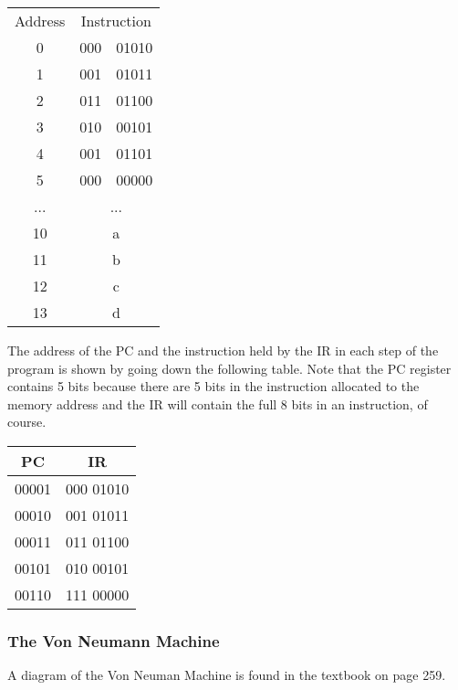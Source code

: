 \documentclass[]{article}
\begin{document}
\begin{center}
	\begin{tabular}{c|c|c|}
		\multicolumn{1}{c}{Address} & \multicolumn{2}{c}{Instruction}\\\cline{2-3}
		0 & 000 & 01010 \\\cline{2-3}
		1 & 001 & 01011 \\\cline{2-3}
		2 & 011 & 01100 \\\cline{2-3}
		3 & 010 & 00101 \\\cline{2-3}
		4 & 001 & 01101 \\\cline{2-3}
		5 & 000 & 00000 \\\cline{2-3}
		...&\multicolumn{2}{|c|}{...} \\\cline{2-3}
		10 & \multicolumn{2}{|c|}{a} \\\cline{2-3}
		11 & \multicolumn{2}{|c|}{b} \\\cline{2-3}
		12 & \multicolumn{2}{|c|}{c} \\\cline{2-3}
		13 & \multicolumn{2}{|c|}{d} \\\cline{2-3}
	\end{tabular}
	\bigbreak
\end{center}

The address of the PC and the instruction held by the IR in each step of the program is shown by going down the following table. Note that the PC register contains 5 bits because there are 5 bits in the instruction allocated to the memory address and the IR will contain the full 8 bits in an instruction, of course.

\begin{center}
	\begin{tabular}{|c|c|}\hline
		PC & IR \\\hline
		00001 & 000 01010 \\\hline
		00010 & 001 01011 \\\hline
		00011 & 011 01100 \\\hline
		00101 & 010 00101 \\\hline
		00110 & 111 00000 \\\hline
	\end{tabular}
	\bigbreak
\end{center}


\subsubsection{The Von Neumann Machine}
\bigbreak

A diagram of the Von Neuman Machine is found in the textbook on page 259.\\
\end{document}
